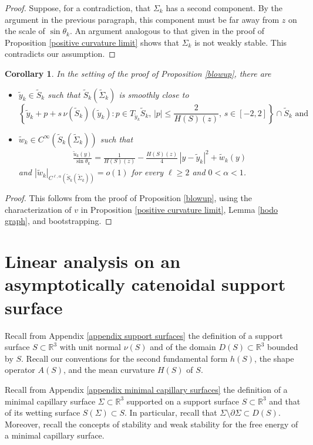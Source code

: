 \documentclass[11pt]{amsart}
\newtheorem{coro}[prop]{Corollary}
\begin{document}
\begin{proof}
	Suppose, for a contradiction, that $\Sigma_k$ has a second component. By the argument in the previous paragraph, this component must be far away from $z$ on the scale  of $\sin\theta_k$. An  argument analogous to that given in the proof of Proposition \ref{positive curvature limit} shows that $\Sigma_k$ is not weakly stable. This contradicts our assumption.
\end{proof}
\begin{coro} \label{blowup coro}
	In the setting of the proof of Proposition \ref{blowup}, there are
	\begin{itemize}
		\item[$\circ$] $\tilde y_k\in \tilde S_k$ such that $\tilde S_k(\tilde \Sigma_k)$ is smoothly close to $$\left\{\tilde y_k+p+s\,\nu(\tilde S_k)(\tilde y_k):p\in T_{\tilde y_k}\tilde S_k, \, |p|\leq \frac{2}{H(S)(z)},\, s\in[-2,2]\right\}\cap \tilde S_k \text{ and}$$ 
		\item[$\circ$] $\tilde w_k\in C^\infty(\tilde S_k(\tilde \Sigma_k))$ such that 
		\begin{align*} 
			\frac{	\tilde u_{k}(y)}{\sin\theta_k}=\frac{1}{H(S)(z)}-\frac{H(S)(z)}{4}\,|y-\tilde y_k|^2+\tilde w_k(y)
		\end{align*} 
		and	  $|\tilde w_k|_{C^{\ell,\alpha}(\tilde S_k(\tilde \Sigma_k))}=o(1)$ for every $\ell\geq 2$ and $0<\alpha<1$.
	\end{itemize}
	


\end{coro}
\begin{proof}
	This follows from the proof of Proposition \ref{blowup}, using the characterization of $v$ in Proposition \ref{positive curvature limit}, Lemma \ref{hodo graph}, and bootstrapping.
\end{proof}
\section{Linear analysis on an asymptotically catenoidal support surface}
	Recall from Appendix \ref{appendix support surfaces} the definition of a support surface $S\subset \mathbb{R}^3$ with unit normal $\nu(S)$  and of the domain $D(S)\subset \mathbb{R}^3$ bounded by $S$.  Recall  our conventions for the second fundamental form $h(S)$, the shape operator $A(S)$, and the mean curvature $H(S)$ of $S$. 



Recall from Appendix \ref{appendix minimal capillary surfaces}  the  definition of a minimal capillary surface $\Sigma \subset \mathbb{R}^3$ supported on a support surface $S\subset \mathbb{R}^3$  and that of its  wetting surface $S(\Sigma)\subset S$. In particular, recall that  $\Sigma\setminus \partial \Sigma \subset D(S)$.  Moreover, recall the concepts of  stability and weak stability for the free energy  of a minimal capillary surface.
\end{document}
